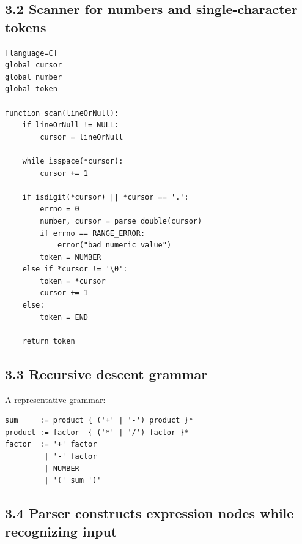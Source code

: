 \documentclass[11pt]{article}
\begin{document}
\subsection{3.2 Scanner for numbers and single-character
tokens}\label{scanner-for-numbers-and-single-character-tokens}

\begin{verbatim}[language=C]
global cursor
global number
global token

function scan(lineOrNull):
    if lineOrNull != NULL:
        cursor = lineOrNull

    while isspace(*cursor):
        cursor += 1

    if isdigit(*cursor) || *cursor == '.':
        errno = 0
        number, cursor = parse_double(cursor)
        if errno == RANGE_ERROR:
            error("bad numeric value")
        token = NUMBER
    else if *cursor != '\0':
        token = *cursor
        cursor += 1
    else:
        token = END

    return token
\end{verbatim}

\subsection{3.3 Recursive descent
grammar}\label{recursive-descent-grammar}

A representative grammar:

\begin{verbatim}
sum     := product { ('+' | '-') product }*
product := factor  { ('*' | '/') factor }*
factor  := '+' factor
         | '-' factor
         | NUMBER
         | '(' sum ')'
\end{verbatim}

\subsection{3.4 Parser constructs expression nodes while recognizing
input}\label{parser-constructs-expression-nodes-while-recognizing-input}
\end{document}
